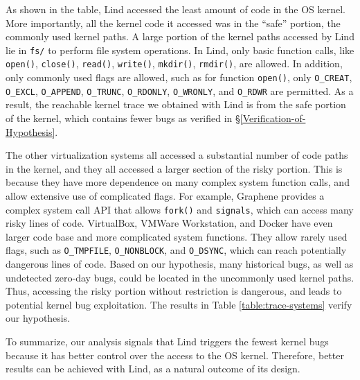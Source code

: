 {{As shown in the table, Lind accessed the least amount of code in the OS
kernel. More importantly,
all the kernel code it accessed was in the ``safe'' portion, the
commonly used kernel paths.
A large portion of the kernel paths accessed by Lind lie in
\texttt{fs/} to perform file system operations.
In Lind, only basic function calls,
like \texttt{open()}, \texttt{close()}, \texttt{read()}, \texttt{write()}, \texttt{mkdir()},
\texttt{rmdir()}, are allowed. In addition, only commonly used flags are allowed, such as
for function \texttt{open()}, only
\texttt{O\_CREAT}, \texttt{O\_EXCL}, \texttt{O\_APPEND}, \texttt{O\_TRUNC},
\texttt{O\_RDONLY}, \texttt{O\_WRONLY}, and \texttt{O\_RDWR} are permitted.
As a result, the reachable kernel trace we obtained with Lind is from the safe
portion of the kernel, which contains fewer bugs
as verified in \S{\ref{Verification-of-Hypothesis}}.

The other virtualization systems all accessed a substantial number of code
paths in the kernel,
and they all accessed a larger section of the risky portion.
This is because they have
more dependence on many complex system function calls, and
allow extensive use of complicated flags. For example,
Graphene provides a complex system call API that allows
\texttt{fork()} and \texttt{signals}, which can access many risky lines of code.
VirtualBox, VMWare Workstation, and Docker have even larger
code base and more complicated system functions. They allow
rarely used flags, such as \texttt{O\_TMPFILE}, \texttt{O\_NONBLOCK},
and \texttt{O\_DSYNC}, which can reach potentially dangerous lines
of code.
%
Based on our hypothesis, many historical bugs, as well as undetected
zero-day bugs, could be located in the uncommonly used kernel paths.
Thus, accessing the risky portion without restriction is dangerous, and
leads to potential kernel bug exploitation. The results in Table
\ref{table:trace-systems} verify our hypothesis.

To summarize, our analysis signals that Lind triggers the fewest kernel bugs because
it has better control over the access to the OS kernel.
Therefore, better results can be achieved with Lind, as a natural
outcome of its design.

}}
